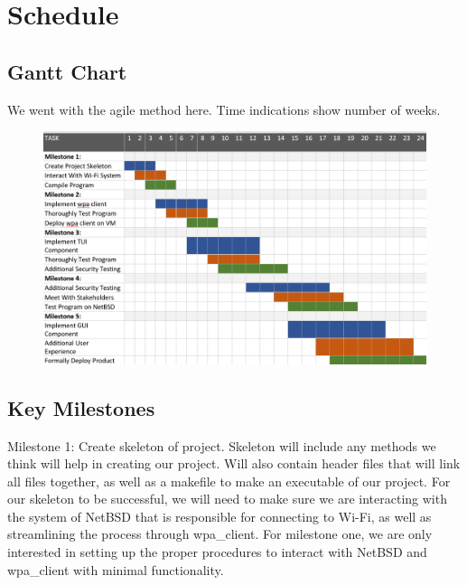 \section{Schedule}

\subsection{Gantt Chart}

We went with the agile method here. Time indications show number of weeks.  
\begin{figure}[!htb]
\includegraphics[scale=0.40]{ganttChart.png}
\end{figure}

\subsection{Key Milestones}

Milestone 1: Create skeleton of project. Skeleton will include any methods we think will help in creating our project. Will also contain header 
files that will link all files together, as well as a makefile to make an executable of our project. For our skeleton to be successful, we will 
need to make sure we are interacting with the system of NetBSD that is responsible for connecting to Wi-Fi, as well as streamlining the process 
through wpa\_client. For milestone one, we are only interested in setting up the proper procedures to interact with NetBSD and wpa\_client with minimal 
functionality. 

